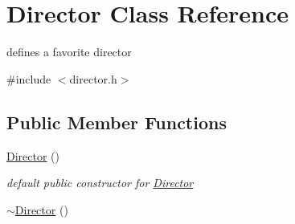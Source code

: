\hypertarget{classDirector}{}\section{Director Class Reference}
\label{classDirector}


defines a favorite director  




{\ttfamily \#include $<$director.\+h$>$}

\subsection*{Public Member Functions}
\begin{DoxyCompactItemize}
\item 
\hyperlink{classDirector_a607a41fe5c42dd9ca7e256a11942a6d7}{Director} ()\hypertarget{classDirector_a607a41fe5c42dd9ca7e256a11942a6d7}{}\label{classDirector_a607a41fe5c42dd9ca7e256a11942a6d7}

\begin{DoxyCompactList}\small\item\em default public constructor for \hyperlink{classDirector}{Director} \end{DoxyCompactList}\item 
\hyperlink{classDirector_a59d7a588bfd4edd22948a9e7fd8c854a}{$\sim$\+Director} ()\hypertarget{classDirector_a59d7a588bfd4edd22948a9e7fd8c854a}{}\label{classDirector_a59d7a588bfd4edd22948a9e7fd8c854a}


\end{DoxyCompactItemize}
